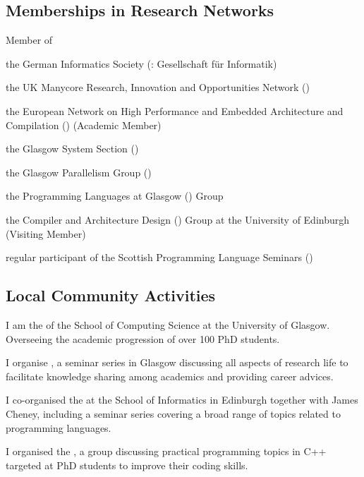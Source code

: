 \subsection{Memberships in Research Networks}
\begin{cvitemize}
    \item Member of
      \begin{inlineItemize}
        \item {}
        \item the German Informatics Society (\@: {\footnotesize Gesellschaft f{\"u}r Informatik})
        \item the UK Manycore Research, Innovation and Opportunities Network ()
        \item the European Network on High Performance and Embedded Architecture and Compilation () (Academic Member)
        \item the Glasgow System Section ()
        \item the Glasgow Parallelism Group ()
        \item the Programming Languages at Glasgow () Group
        \item the Compiler and Architecture Design () Group at the University of Edinburgh (Visiting Member)
        \item regular participant of the Scottish Programming Language Seminars ()
      \end{inlineItemize}
\end{cvitemize}

\subsection{Local Community Activities}
\begin{cvitemize}
  \item I am the  of the School of Computing Science at the University of Glasgow.
        Overseeing the academic progression of over 100 PhD students.
  \item I organise , a seminar series in Glasgow discussing all aspects of research life to facilitate knowledge sharing among academics and providing career advices.
  \item I co-organised the  at the School of Informatics in Edinburgh together with James Cheney, including a seminar series covering a broad range of topics related to programming languages.
  \item I organised the , a group discussing practical programming topics in C++ targeted at PhD students to improve their coding skills.
\end{cvitemize}
